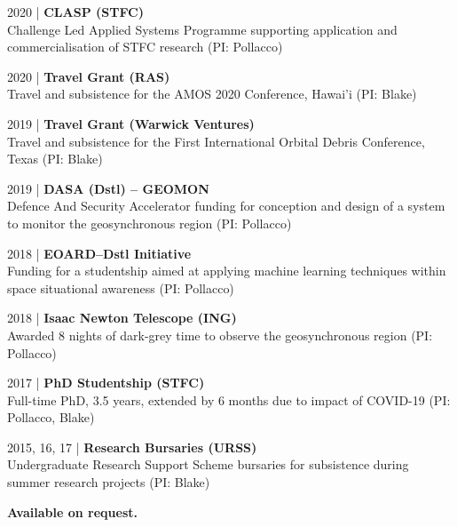 \justify
\vspace{-1em}
\small 2020 | \textbf{CLASP (STFC)} \\
Challenge Led Applied Systems Programme supporting application and commercialisation of STFC research (PI: Pollacco)

\divider

\small 2020 | \textbf{Travel Grant (RAS)} \\
Travel and subsistence for the AMOS 2020 Conference, Hawai'i (PI: Blake)

\divider

\small 2019 | \textbf{Travel Grant (Warwick Ventures)} \\
Travel and subsistence for the First International Orbital Debris Conference, Texas (PI: Blake)

\divider

\small 2019 | \textbf{DASA (Dstl) -- GEOMON} \\
Defence And Security Accelerator funding for conception and design of a system to monitor the geosynchronous region (PI: Pollacco)

\divider

\small 2018 | \textbf{EOARD--Dstl Initiative} \\
Funding for a studentship aimed at applying machine learning techniques within space situational awareness (PI: Pollacco)

\divider

\small 2018 | \textbf{Isaac Newton Telescope (ING)} \\
Awarded 8 nights of dark-grey time to observe the geosynchronous region (PI: Pollacco)

\divider

\small 2017 | \textbf{PhD Studentship (STFC)} \\
Full-time PhD, 3.5 years, extended by 6 months due to impact of COVID-19 (PI: Pollacco, Blake)

\divider

\small 2015, 16, 17 | \textbf{Research Bursaries (URSS)} \\
Undergraduate Research Support Scheme bursaries for subsistence during summer research projects (PI: Blake)

\medskip


\normalsize \textbf{Available on request.}